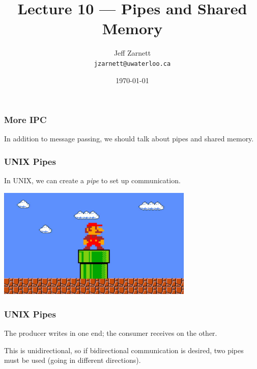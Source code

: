 

\title{Lecture 10 --- Pipes and Shared Memory}

\author{Jeff Zarnett \\ \small \texttt{jzarnett@uwaterloo.ca}}
\date{\today}




\begin{frame}
	\titlepage

\end{frame}

\begin{frame}
	\frametitle{More IPC}

	In addition to message passing, we should talk about pipes and shared memory.


\end{frame}


\begin{frame}
	\frametitle{UNIX Pipes}

	In UNIX, we can create a \textit{pipe} to set up communication.

	\begin{center}
		\includegraphics[width=0.7\textwidth]{images/mario-pipe.jpg}
	\end{center}

\end{frame}

\begin{frame}
	\frametitle{UNIX Pipes}




	The producer writes in one end; the consumer receives on the other.

	This is unidirectional, so if bidirectional communication is desired, two pipes must be used (going in different directions).

\end{frame}

